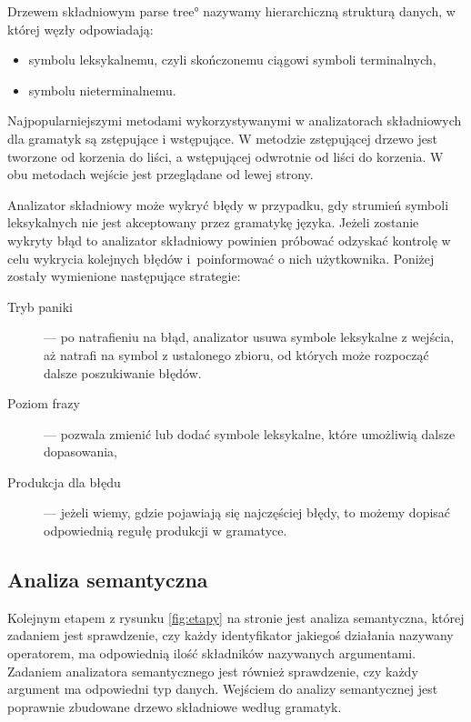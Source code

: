 Drzewem składniowym \ang{parse tree} nazywamy hierarchiczną strukturą danych,
 w której węzły odpowiadają:
\begin{itemize}
  \item  
    symbolu leksykalnemu, czyli skończonemu  ciągowi symboli terminalnych,
  \item  
    symbolu nieterminalnemu.
\end{itemize}


Najpopularniejszymi metodami wykorzystywanymi w analizatorach składniowych
 dla gramatyk są zstępujące i wstępujące.
W metodzie zstępującej drzewo jest tworzone od korzenia do liści,
 a wstępującej odwrotnie od liści do korzenia.
W obu metodach wejście jest przeglądane od lewej strony.

Analizator składniowy może wykryć błędy w przypadku,
 gdy strumień symboli leksykalnych nie jest akceptowany przez gramatykę języka.
Jeżeli zostanie wykryty błąd to analizator składniowy powinien próbować odzyskać kontrolę w celu wykrycia kolejnych błędów
 i~poinformować o nich użytkownika.
Poniżej zostały  wymienione następujące strategie\cite{aho}:
\begin{description}
  \item[Tryb paniki] --- 
     po natrafieniu na błąd,
     analizator usuwa symbole leksykalne z wejścia, 
     aż natrafi na symbol z ustalonego zbioru,
     od których może rozpocząć dalsze poszukiwanie błędów.
  \item[Poziom frazy] --- 
      pozwala zmienić lub dodać symbole leksykalne,
      które umożliwią dalsze dopasowania,
  \item [Produkcja dla błędu] --- 
     jeżeli wiemy, 
     gdzie pojawiają się najczęściej błędy,
     to możemy dopisać odpowiednią regułę produkcji w gramatyce.
\end{description}

\subsection{Analiza semantyczna} \label{p_semantyczna}
Kolejnym etapem z rysunku \ref{fig:etapy} na stronie \pageref{fig:etapy} jest analiza semantyczna,
 której zadaniem jest sprawdzenie, 
 czy każdy identyfikator jakiegoś działania nazywany operatorem, ma odpowiednią ilość składników nazywanych argumentami.
Zadaniem analizatora semantycznego jest również sprawdzenie, czy każdy argument ma odpowiedni typ danych.
Wejściem do analizy semantycznej jest poprawnie zbudowane drzewo składniowe według gramatyk. \cite{aho}

